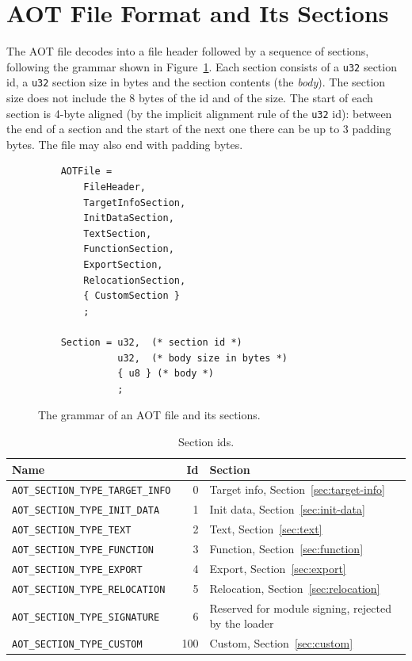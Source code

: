 \documentclass{article}
\begin{document}
\section{AOT File Format and Its Sections}
The AOT file decodes into a file header followed by a sequence of sections, following the grammar shown in Figure~\ref{listing:aot-file-grammar}.
Each section consists of a \verb|u32| section id, a \verb|u32| section size in bytes and the section contents (the \emph{body}).
The section size does not include the 8 bytes of the id and of the size.
The start of each section is 4-byte aligned (by the implicit alignment rule of the \verb|u32| id): between the end of a section and the start of the next one there can be up to 3 padding bytes.
The file may also end with padding bytes.

\begin{figure}[H]
    \begin{verbatim}
    AOTFile =
        FileHeader,
        TargetInfoSection,
        InitDataSection,
        TextSection,
        FunctionSection,
        ExportSection,
        RelocationSection,
        { CustomSection }
        ;

    Section = u32,  (* section id *)
              u32,  (* body size in bytes *)
              { u8 } (* body *)
              ;
\end{verbatim}
\caption{The grammar of an AOT file and its sections.}
\label{listing:aot-file-grammar}
\end{figure}

\begin{table}[H]
\centering
\begin{tabular}{lrl}
    \hline
    Name & Id & Section \\
    \hline
    \verb|AOT_SECTION_TYPE_TARGET_INFO| & 0 & Target info, Section~\ref{sec:target-info} \\
    \verb|AOT_SECTION_TYPE_INIT_DATA|   & 1 & Init data, Section~\ref{sec:init-data} \\
    \verb|AOT_SECTION_TYPE_TEXT|        & 2 & Text, Section~\ref{sec:text} \\
    \verb|AOT_SECTION_TYPE_FUNCTION|    & 3 & Function, Section~\ref{sec:function} \\
    \verb|AOT_SECTION_TYPE_EXPORT|      & 4 & Export, Section~\ref{sec:export} \\
    \verb|AOT_SECTION_TYPE_RELOCATION|  & 5 & Relocation, Section~\ref{sec:relocation} \\
    \verb|AOT_SECTION_TYPE_SIGNATURE|   & 6 & Reserved for module signing, rejected by the loader \\
    \verb|AOT_SECTION_TYPE_CUSTOM|      & 100 & Custom, Section~\ref{sec:custom} \\
    \hline
\end{tabular}
\caption{Section ids.}
\label{table:section-ids}
\end{table}
\end{document}
